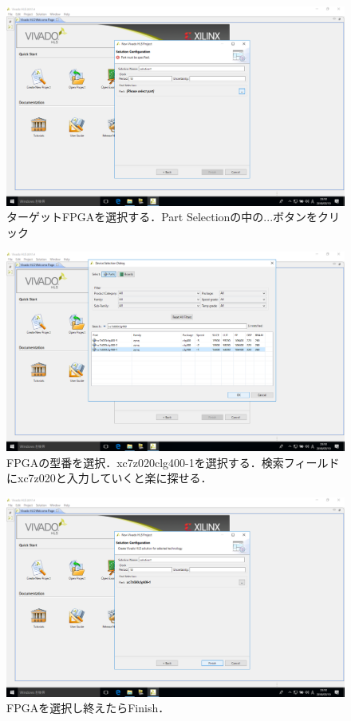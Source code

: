 \documentclass[a4paper,dvipdfmx]{jsarticle}
\begin{document}
 \begin{figure}[H]
  \begin{center}
   \includegraphics[width=.8\textwidth]{chapter08_figures/VirtualBox_Windows10_19_03_2018_23_10_19.png}
  \end{center}
  \caption{ターゲットFPGAを選択する．Part Selectionの中の...ボタンをクリック}
 \end{figure}

 \begin{figure}[H]
  \begin{center}
   \includegraphics[width=.8\textwidth]{chapter08_figures/VirtualBox_Windows10_19_03_2018_23_10_34.png}
  \end{center}
  \caption{FPGAの型番を選択．xc7z020clg400-1を選択する．検索フィールドにxc7z020と入力していくと楽に探せる．}
 \end{figure}

 \begin{figure}[H]
  \begin{center}
   \includegraphics[width=.8\textwidth]{chapter08_figures/VirtualBox_Windows10_19_03_2018_23_10_39.png}
  \end{center}
  \caption{FPGAを選択し終えたらFinish．}
 \end{figure}
\end{document}

